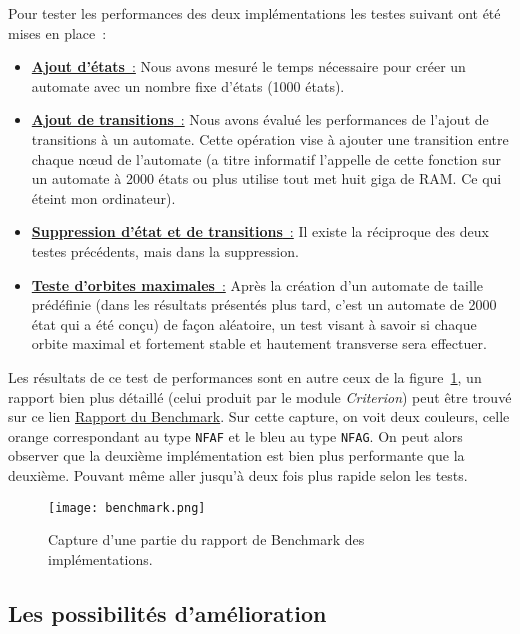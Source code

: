\vphantom{}

Pour tester les performances des deux implémentations les testes suivant ont été 
mises en place~:

\begin{itemize}
  \item[\textbullet] \underline{\textbf{Ajout d'états}~:} Nous avons mesuré le 
  temps nécessaire pour créer un automate avec un nombre fixe d'états 
  (1000 états).
  \item[\textbullet] \underline{\textbf{Ajout de transitions}~:} Nous avons 
  évalué les performances de l'ajout de transitions à un automate. 
  Cette opération vise à ajouter une transition entre chaque n\oe ud de 
  l'automate (a titre informatif l'appelle de cette fonction sur un automate à 
  2000 états ou plus utilise tout met huit giga de RAM. Ce qui éteint mon 
  ordinateur).
  \item[\textbullet] \underline{\textbf{Suppression d'état et de transitions}~:}
  Il existe la réciproque des deux testes précédents, mais dans la suppression.
  \item[\textbullet] \underline{\textbf{Teste d'orbites maximales}~:} Après la 
  création d'un automate de taille prédéfinie (dans les résultats présentés plus 
  tard, c'est un automate de 2000 état qui a été conçu) de façon aléatoire, un 
  test visant à savoir si chaque orbite maximal et fortement stable et hautement 
  transverse sera effectuer.
\end{itemize}

\vphantom{}

Les résultats de ce test de performances sont en autre ceux de la 
figure~\ref{fig:imgBench}, un rapport bien plus détaillé (celui produit par le 
module \textit{Criterion}) peut être trouvé sur ce lien 
\href{run:./report_perf.html}{Rapport du Benchmark}. Sur cette capture, on voit 
deux couleurs, celle orange correspondant au type \texttt{NFAF} et 
le bleu au type \texttt{NFAG}. On peut alors observer que la 
deuxième implémentation est bien plus performante que la deuxième. Pouvant même 
aller jusqu'à deux fois plus rapide selon les tests.

\begin{figure}[H]
  \texttt{[image: benchmark.png]}
  \caption{
    Capture d'une partie du rapport de Benchmark des implémentations.
  }\label{fig:imgBench}
\end{figure}

\subsection{Les possibilités d'amélioration}

